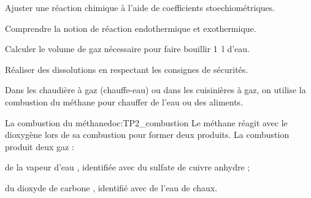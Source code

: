 \teteSndChim


\begin{objectifs}
  \item Ajuster une réaction chimique à l'aide de coefficients stoechiométriques.
  \item Comprendre la notion de réaction endothermique et exothermique. 
  \item Calculer le volume de gaz nécessaire pour faire bouillir \qty{1}{\litre} d'eau.
  \item Réaliser des dissolutions en respectant les consignes de sécurités.
\end{objectifs}

\begin{contexte}
  Dans les chaudière à gaz (chauffe-eau) ou dans les cuisinières à gaz, on utilise la combustion du méthane pour chauffer de l'eau ou des aliments.
  
\end{contexte}


\begin{doc}{La combustion du méthane}{doc:TP2_combustion}
  Le méthane  réagit avec le dioxygène  lors de sa combustion pour former deux produits.
  La combustion produit deux gaz :
  \begin{listePoints}
    \item de la vapeur d'eau , identifiée avec du sulfate de cuivre anhydre ;
    \item du dioxyde de carbone , identifié avec de l'eau de chaux.
  \end{listePoints}
\end{doc}




